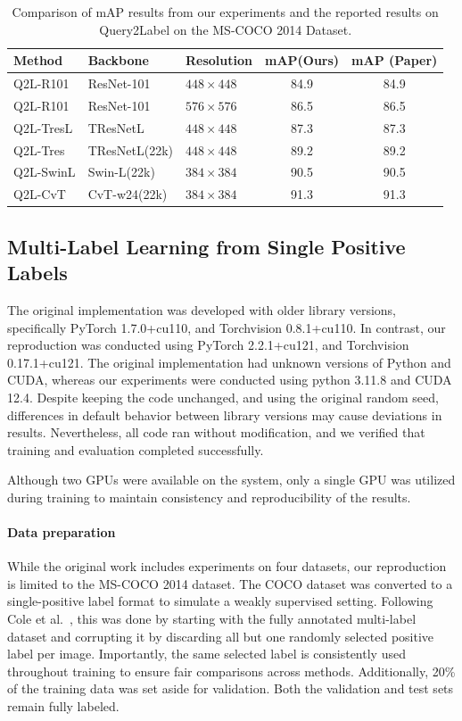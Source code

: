\documentclass[lettersize,journal]{IEEEtran}
\begin{document}
\begin{table}[t]
    \small
    \caption{Comparison of mAP results from our experiments and the reported results on Query2Label on the MS-COCO 2014 Dataset.}
    \label{tab:q2l_map_comparison}
    \centering
    \begin{tabular}{l l l c c}
    \toprule
    \textbf{Method} & \textbf{Backbone} & \textbf{Resolution} & \textbf{mAP(Ours)} & \textbf{mAP (Paper)} \\
    \midrule
    Q2L-R101     & ResNet-101     & $448\times448$ & 84.9 & 84.9 \\
    Q2L-R101     & ResNet-101     & $576\times576$ & 86.5 & 86.5 \\
    Q2L-TresL    & TResNetL       & $448\times448$ & 87.3 & 87.3 \\
    Q2L-Tres     & TResNetL(22k)  & $448\times448$ & 89.2 & 89.2 \\
    Q2L-SwinL    & Swin-L(22k)    & $384\times384$ & 90.5 & 90.5 \\
    Q2L-CvT      & CvT-w24(22k)   & $384\times384$ & 91.3 & 91.3 \\
    \bottomrule
    \end{tabular}
\end{table}

\subsection{Multi-Label Learning from Single Positive Labels}
The original implementation was developed with older library versions, specifically PyTorch 1.7.0+cu110, and Torchvision 0.8.1+cu110. In contrast, our reproduction was conducted using PyTorch 2.2.1+cu121, and Torchvision 0.17.1+cu121. The original implementation had unknown versions of Python and CUDA, whereas our experiments were conducted using python 3.11.8 and CUDA 12.4. Despite keeping the code unchanged, and using the original random seed, differences in default behavior between library versions may cause deviations in results. Nevertheless, all code ran without modification, and we verified that training and evaluation completed successfully.

Although two GPUs were available on the system, only a single GPU was utilized during training to maintain consistency and reproducibility of the results.

\paragraph{Data preparation}
While the original work includes experiments on four datasets, our reproduction is limited to the MS-COCO 2014 dataset. The COCO dataset was converted to a single-positive label format to simulate a weakly supervised setting. Following Cole et al.~\cite{mlsp}, this was done by starting with the fully annotated multi-label dataset and corrupting it by discarding all but one randomly selected positive label per image. Importantly, the same selected label is consistently used throughout training to ensure fair comparisons across methods. Additionally, 20\% of the training data was set aside for validation. Both the validation and test sets remain fully labeled.
\end{document}
